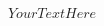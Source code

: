 \documentclass[preview]{standalone}
\begin{document}
\begin{CJK*}{GBK}{hwzs}
\centering

\begin{align*}
    YourTextHere
\end{align*}

\end{CJK*}
\end{document}
